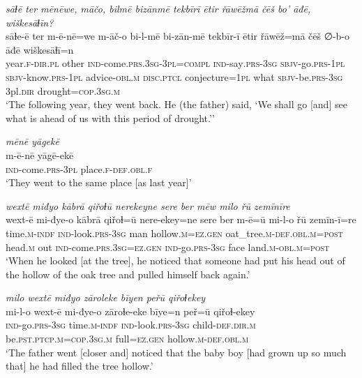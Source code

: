 \ea \label{ZB.46}
\textit{sāɫē ter mēnēwe, māčo, bilmē bizānmē tekbīrī ētir řāwēžmā čēš bo’ āđē, wiškesāɫīn?} \\ 
\gll sāɫe-ē ter m-ē-nē=we m-āč-o bi-l-mē bi-zān-mē tekbīr-ī ētir řāwēž=mā čēš ∅-b-o āđē wiškesāɫī=n \\ 
 year\textsc{.f}\textsc{-dir}\textsc{.pl} other \textsc{ind-}come\textsc{.prs}\textsc{.3sg}\textsc{-3pl}\textsc{=compl} \textsc{ind-}say\textsc{.prs}\textsc{-3sg} \textsc{sbjv-}go\textsc{.prs}\textsc{-1pl} \textsc{sbjv-}know\textsc{.prs}\textsc{-1pl} advice\textsc{-obl}\textsc{.m} \textsc{disc.ptcl} conjecture\textsc{=1pl} what \textsc{sbjv-}be\textsc{.prs}\textsc{-3sg} 3pl\textsc{.dir} drought\textsc{=cop}\textsc{.3sg}\textsc{.m} \\ 
\glt `The following year, they went back. He (the father) said, ‘We shall go [and] see what is ahead of us with this period of drought.’'
\z 
 
\ea \label{ZB.47}
\textit{mēnē yāgekē} \\ 
\gll m-ē-nē yāgē-ekē \\ 
 \textsc{ind-}come\textsc{.prs}\textsc{-3pl} place\textsc{.f}\textsc{-def}\textsc{.obl}\textsc{.f} \\ 
\glt `They went to the same place [as last year]'
\z 
 
\ea \label{ZB.48}
\textit{wextē miđyo kābrā qiřoɫū nerekeyne sere ber mēw milo řū zemīnīre} \\ 
\gll wext-ē mi-đye-o kābrā qiřoɫ=ū nere-ekey=ne sere ber m-ē=ū mi-l-o řū zemīn-ī=re \\ 
 time\textsc{.m}\textsc{-indf} \textsc{ind-}look\textsc{.prs}\textsc{-3sg} man hollow\textsc{.m}\textsc{\textsc{=ez.gen}} oat\_tree\textsc{.m}\textsc{-def}\textsc{.obl}\textsc{.m}\textsc{=\textsc{post}} head\textsc{.m} out \textsc{ind-}come\textsc{.prs}\textsc{.3sg}\textsc{\textsc{=ez.gen}} \textsc{ind-}go\textsc{.prs}\textsc{-3sg} face land\textsc{.m}\textsc{-obl}\textsc{.m}\textsc{=\textsc{post}} \\ 
\glt `When he looked [at the tree], he noticed that someone had put his head out of the hollow of the oak tree and pulled himself back again.'
\z 
 
\ea \label{ZB.49}
\textit{milo wextē miđyo zāroleke bīyen peřū qiřoɫekey} \\ 
\gll mi-l-o wext-ē mi-đye-o zāroɫe-eke bīye=n peř=ū qiřoɫ-ekey \\ 
 \textsc{ind-}go\textsc{.prs}\textsc{-3sg} time\textsc{.m}\textsc{-indf} \textsc{ind-}look\textsc{.prs}\textsc{-3sg} child\textsc{-def}\textsc{.dir}\textsc{.m} be\textsc{.pst}\textsc{.ptcp}\textsc{.m}\textsc{=cop}\textsc{.3sg}\textsc{.m} full\textsc{\textsc{=ez.gen}} hollow\textsc{.m}\textsc{-def}\textsc{.obl}\textsc{.m} \\ 
\glt `The father went [closer and] noticed that the baby boy [had grown up so much that] he had filled the tree hollow.'
\z 
 
